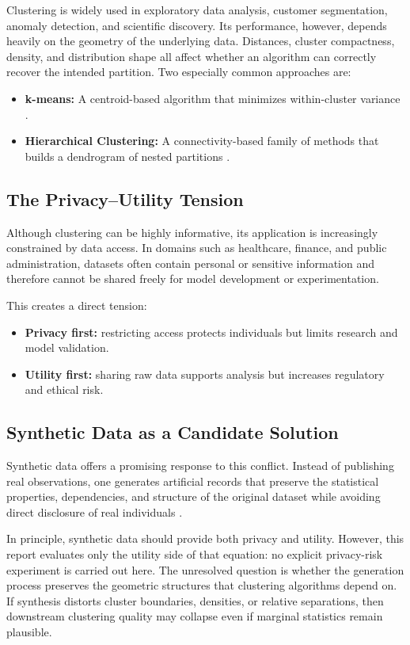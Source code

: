 Clustering is widely used in exploratory data analysis, customer segmentation, anomaly detection, and scientific discovery. Its performance, however, depends heavily on the geometry of the underlying data. Distances, cluster compactness, density, and distribution shape all affect whether an algorithm can correctly recover the intended partition. Two especially common approaches are:
\begin{itemize}
  \item \textbf{k-means:} A centroid-based algorithm that minimizes within-cluster variance \cite{macqueen1967}.
  \item \textbf{Hierarchical Clustering:} A connectivity-based family of methods that builds a dendrogram of nested partitions \cite{ward1963}.
\end{itemize}

\subsection{The Privacy--Utility Tension}
Although clustering can be highly informative, its application is increasingly constrained by data access. In domains such as healthcare, finance, and public administration, datasets often contain personal or sensitive information and therefore cannot be shared freely for model development or experimentation.

This creates a direct tension:
\begin{itemize}
  \item \textbf{Privacy first:} restricting access protects individuals but limits research and model validation.
  \item \textbf{Utility first:} sharing raw data supports analysis but increases regulatory and ethical risk.
\end{itemize}

\subsection{Synthetic Data as a Candidate Solution}
Synthetic data offers a promising response to this conflict. Instead of publishing real observations, one generates artificial records that preserve the statistical properties, dependencies, and structure of the original dataset while avoiding direct disclosure of real individuals \cite{nowok2016,qian2024}.

In principle, synthetic data should provide both privacy and utility. However, this report evaluates only the utility side of that equation: no explicit privacy-risk experiment is carried out here. The unresolved question is whether the generation process preserves the geometric structures that clustering algorithms depend on. If synthesis distorts cluster boundaries, densities, or relative separations, then downstream clustering quality may collapse even if marginal statistics remain plausible.

